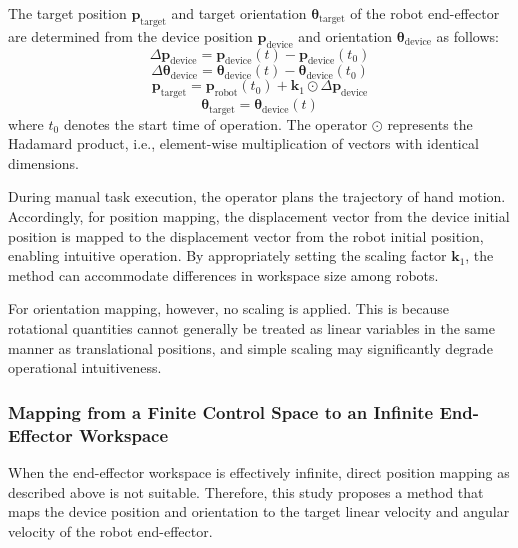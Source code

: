 \documentclass{WileyMSP-template}
\begin{document}
The target position $\bm{p}_{\text{target}}$ and target orientation $\bm{\theta}_{\text{target}}$ of the robot end-effector are determined from the device position $\bm{p}_{\text{device}}$ and orientation $\bm{\theta}_{\text{device}}$ as follows:
\begin{equation}
  \Delta \bm{p}_{\text{device}} = \bm{p}_{\text{device}}(t) - \bm{p}_{\text{device}}(t_0)
\end{equation}
\begin{equation}
  \Delta \bm{\theta}_{\text{device}} = \bm{\theta}_{\text{device}}(t) - \bm{\theta}_{\text{device}}(t_0)
\end{equation}
\begin{equation}
  \bm{p}_{\text{target}} = \bm{p}_{\text{robot}}(t_0) + \bm{k}_1 \odot \Delta \bm{p}_{\text{device}}
\end{equation}
\begin{equation}
  \bm{\theta}_{\text{target}} = \bm{\theta}_{\text{device}}(t)
\end{equation}
where $t_0$ denotes the start time of operation.  
The operator $\odot$ represents the Hadamard product, i.e., element-wise multiplication of vectors with identical dimensions.

During manual task execution, the operator plans the trajectory of hand motion.  
Accordingly, for position mapping, the displacement vector from the device initial position is mapped to the displacement vector from the robot initial position, enabling intuitive operation.  
By appropriately setting the scaling factor $\bm{k}_1$, the method can accommodate differences in workspace size among robots.

For orientation mapping, however, no scaling is applied.  
This is because rotational quantities cannot generally be treated as linear variables in the same manner as translational positions, and simple scaling may significantly degrade operational intuitiveness.

\subsubsection{Mapping from a Finite Control Space to an Infinite End-Effector Workspace}\label{subsec:velmode}

When the end-effector workspace is effectively infinite, direct position mapping as described above is not suitable.  
Therefore, this study proposes a method that maps the device position and orientation to the target linear velocity and angular velocity of the robot end-effector.
\end{document}
